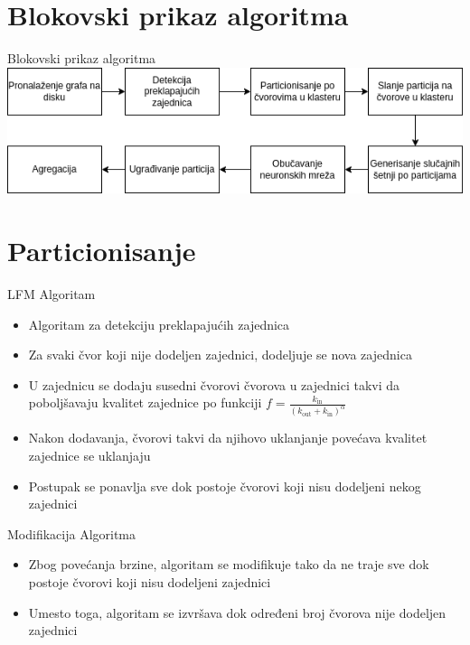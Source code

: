 \documentclass{beamer}
\begin{document}
\section{Blokovski prikaz algoritma}
\begin{frame}{Blokovski prikaz algoritma}
    \includegraphics[width=\textwidth]{./png/Blokovski prikaz algoritma.drawio.png}
\end{frame}

\section{Particionisanje}
\begin{frame}{LFM Algoritam}
    \begin{itemize}
        \item Algoritam za detekciju preklapajućih zajednica 
        \item Za svaki čvor koji nije dodeljen zajednici, dodeljuje se nova zajednica 
        \item U zajednicu se dodaju susedni čvorovi čvorova u zajednici takvi da poboljšavaju kvalitet zajednice po funkciji $ f = \frac{k_\text{in}}{(k_\text{out} + k_\text{in})^\alpha} $ 
        \item Nakon dodavanja, čvorovi takvi da njihovo uklanjanje povećava kvalitet zajednice se uklanjaju
        \item Postupak se ponavlja sve dok postoje čvorovi koji nisu dodeljeni nekog zajednici
    \end{itemize}
\end{frame}

\begin{frame}{Modifikacija Algoritma}
    \begin{itemize}
        \item Zbog povećanja brzine, algoritam se modifikuje tako da ne traje sve dok postoje čvorovi koji nisu dodeljeni zajednici
        \item Umesto toga, algoritam se izvršava dok određeni broj čvorova nije dodeljen zajednici
    \end{itemize}
\end{frame}
\end{document}
